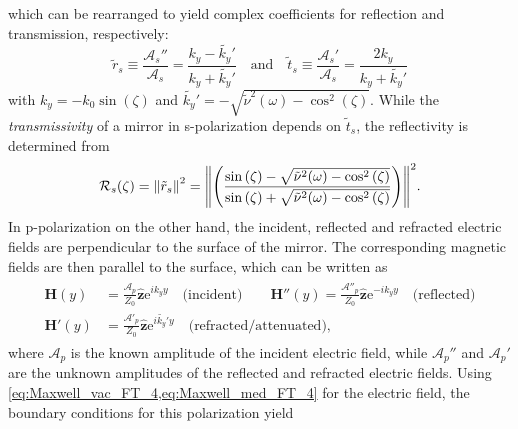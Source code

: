 which can be rearranged to yield complex coefficients for reflection and transmission, respectively:
\begin{equation}\label{eq:s_coeff}
 \tilde{r}_s \equiv \frac{\mathcal{A}_s''}{\mathcal{A}_s} = \frac{k_y - \tilde{k_y}'}{k_y + \tilde{k_y}'} \quad \text{and} \quad \tilde{t}_s \equiv \frac{\mathcal{A}_s'}{\mathcal{A}_s} = \frac{2 k_y}{k_y + \tilde{k_y}'} 
 \end{equation}
with $k_y = - k_0 \sin (\zeta)$ and $\tilde{k_y}' = - \sqrt{\tilde{\nu}^2 (\omega) - \cos^2 \left( \zeta \right)}$. 
While the \emph{transmissivity} of a mirror in s-polarization depends on $\tilde{t}_s$, the reflectivity is determined from
\begin{equation}\label{eq:s_reflectivity}
 \mathcal{R}_s (\zeta) = \norm{\tilde{r}_s}^2 = \norm{\left( \frac{\sin \left( \zeta \right) - \sqrt{\tilde{\nu}^2 (\omega) - \cos^2 \left( \zeta \right)}}{\sin \left( \zeta \right) + \sqrt{\tilde{\nu}^2 (\omega) - \cos^2 \left( \zeta \right)}} \right)}^2 .
 \end{equation}
In p-polarization on the other hand, the incident, reflected and refracted electric fields are perpendicular to the surface of the mirror. 
The corresponding magnetic fields are then parallel to the surface, which can be written as 
\begin{subequations}
\begin{align}
\begin{split}
 \mathbold{H} (y) &= \frac{\mathcal{A}_p}{Z_0} \mathbold{\hat{z}} \mathrm{e}^{i k_y y} \quad \text{(incident)} \quad \quad \mathbold{H''} (y) = \frac{\mathcal{A''}_p}{Z_0} \mathbold{\hat{z}} \mathrm{e}^{-i k_y y} \quad \text{(reflected)} \\
 \mathbold{H'} (y) &= \frac{\mathcal{A'}_p}{Z_0} \mathbold{\hat{z}} \mathrm{e}^{i \tilde{k_y}' y} \quad \text{(refracted/attenuated)} ,
 \end{split}
 \end{align} 
\end{subequations}
where $\mathcal{A}_p$ is the known amplitude of the incident electric field, while $\mathcal{A}_p''$ and $\mathcal{A}_p'$ are the unknown amplitudes of the reflected and refracted electric fields. 
Using \cref{eq:Maxwell_vac_FT_4,eq:Maxwell_med_FT_4} for the electric field, the boundary conditions for this polarization yield 
